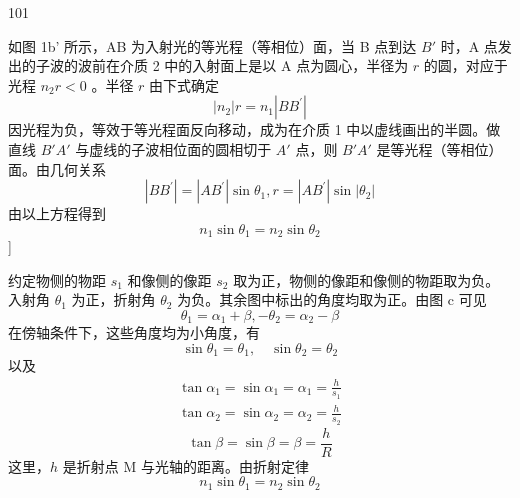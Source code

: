 \begin{solution}{101}
\begin{subsolution}
        如图 1b' 所示，AB 为入射光的等光程（等相位）面，当 B 点到达 $B'$ 时，A 点发出的子波的波前在介质 2 中的入射面上是以 A 点为圆心，半径为 $r$ 的圆，对应于光程 $n_{2}r < 0$ 。半径 $r$ 由下式确定
        \begin{equation*}
            \left| n _ {2} \right| r = n _ {1} \left| B B ^ {\prime} \right|
        \end{equation*}
        因光程为负，等效于等光程面反向移动，成为在介质 1 中以虚线画出的半圆。做直线 $B'A'$ 与虚线的子波相位面的圆相切于 $A'$ 点，则 $B'A'$ 是等光程（等相位）面。由几何关系
        \begin{equation*}
            \left| B B ^ {\prime} \right| = \left| A B ^ {\prime} \right| \sin \theta_ {1}, r = \left| A B ^ {\prime} \right| \sin \left| \theta_ {2} \right|
        \end{equation*}
        由以上方程得到
        \begin{equation*}
            n _ {1} \sin \theta_ {1} = n _ {2} \sin \theta_ {2}
        \end{equation*}
        ]
    \end{subsolution}
    \begin{subsolution}
        约定物侧的物距 $s_{1}$ 和像侧的像距 $s_{2}$ 取为正，物侧的像距和像侧的物距取为负。入射角 $\theta_{1}$ 为正，折射角 $\theta_{2}$ 为负。其余图中标出的角度均取为正。由图 c 可见
        \begin{equation}
            \theta_ {1} = \alpha_ {1} + \beta , - \theta_ {2} = \alpha_ {2} - \beta
            \label{eq:6.p101}
        \end{equation}
        在傍轴条件下，这些角度均为小角度，有
        \begin{equation*}
            \sin \theta_ {1} = \theta_ {1}, \quad \sin \theta_ {2} = \theta_ {2}
        \end{equation*}
        以及
        \begin{align*}
            \tan \alpha_ {1} = \sin \alpha_ {1} = \alpha_ {1} = \frac {h}{s _ {1}} \\
            \tan \alpha_ {2} = \sin \alpha_ {2} = \alpha_ {2} = \frac {h}{s _ {2}}
        \end{align*}
        \begin{equation}
            \tan \beta = \sin \beta = \beta = \frac {h}{R}
            \label{eq:7.p101}
        \end{equation}
        这里，$h$ 是折射点 M 与光轴的距离。由折射定律
        \begin{equation*}
            n _ {1} \sin \theta_ {1} = n _ {2} \sin \theta_ {2}

\end{equation*}
\end{subsolution}
\end{solution}
